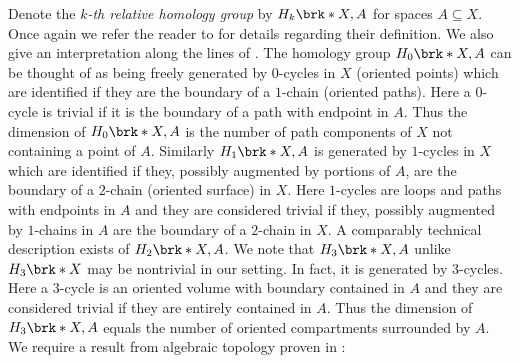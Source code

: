 Denote the \emph{$k$-th relative homology group} by $H_k\brk*{X,A}$ for spaces $A\subseteq X$.
Once again we refer the reader to \cite[Chapter 2]{Hatcher2002} for details regarding their definition.
We also give an interpretation along the lines of \cite{Cantarella2002}.
The homology group $H_0\brk*{X,A}$ can be thought of as being freely generated by $0$-cycles in $X$ (oriented points)
which are identified if they are the boundary of a $1$-chain (oriented paths).
Here a $0$-cycle is trivial if it is the boundary of a path with endpoint in $A$.
Thus the dimension of $H_0\brk*{X,A}$ is the number of path components of $X$ not containing a point of $A$.
Similarly $H_1\brk*{X,A}$ is generated by $1$-cycles in $X$ which are identified if they, possibly augmented by 
portions of $A$, are the boundary of a $2$-chain (oriented surface) in $X$.
Here $1$-cycles are loops and paths with endpoints in $A$ and they are considered trivial if they, possibly augmented by $1$-chains in $A$ are the boundary
of a $2$-chain in $X$.
A comparably technical description exists of $H_2\brk*{X,A}$.
We note that $H_3\brk*{X,A}$ unlike $H_3\brk*{X}$ may be nontrivial in our setting.
In fact, it is generated by $3$-cycles.
Here a $3$-cycle is an oriented volume with boundary contained in $A$ and they are considered trivial if
they are entirely contained in $A$.
Thus the dimension of $H_3\brk*{X,A}$ equals the number of oriented compartments surrounded by $A$.
%
We require a result from algebraic topology proven in \cite[Corollary 2.24]{Hatcher2002}:
